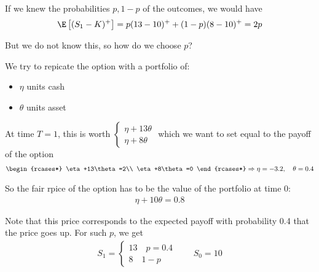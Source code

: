 \noindent If we knew the probabilities $p,1-p$ of the outcomes, we would have
\begin{equation*}
  \begin{gathered}
    \E\left[(S_1-K)^+\right] = p(13-10)^++(1-p)(8-10)^+ =2p
  \end{gathered}
\end{equation*}\par
\noindent But we do not know this, so how do we choose $p$?\par
\noindent We try to repicate the option with a portfolio of:\par
\begin{itemize}
  \item $\eta$ units cash
  \item $\theta$ units asset
\end{itemize}\par
\noindent At time $T =1$, this is worth $\begin{cases}
  \eta+13\theta\\\eta+8\theta
\end{cases}$ which we want to set equal to the payoff of the option
\begin{equation*}
  \begin{gathered}
    \begin{rcases*}
      \eta+13\theta=2\\
      \eta+8\theta=0
    \end{rcases*}\Rightarrow \eta =-3.2,\quad\theta = 0.4
  \end{gathered}
\end{equation*}\par
\noindent So the fair rpice of the option has to be the value of the portfolio at time 0:
\begin{equation*}
  \begin{gathered}
    \eta+10\theta = 0.8
  \end{gathered}
\end{equation*}
\par\bigskip
\noindent Note that this price corresponds to the expected payoff with probability 0.4 that the price goes up. For such $p$, we get
\begin{equation*}
  \begin{gathered}
    S_1 = \begin{cases}
      13\quad p=0.4\\
      8\quad 1-p
    \end{cases}\qquad S_0=10
  \end{gathered}
\end{equation*}\par
